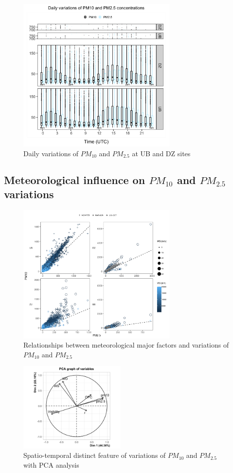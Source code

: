 \documentclass[
  11pt,
]{article}
\begin{document}
\newpage

\begin{figure}
\centering
\includegraphics[width=3.125in,height=\textheight,keepaspectratio]{images/figure_5.png}
\caption{Daily variations of \(PM_{10}\) and \(PM_{2.5}\) at UB and DZ
sites}
\end{figure}

\newpage
\subsection{Meteorological influence on $PM_{10}$ and $PM_{2.5}$ variations}
\label{subsec2}

\begin{figure}
\centering
\includegraphics[width=3.125in,height=\textheight,keepaspectratio]{images/figure_6.png}
\caption{Relationships between meteorological major factors and
variations of \(PM_{10}\) and \(PM_{2.5}\)}
\end{figure}

\newpage

\begin{figure}
\centering
\includegraphics[width=2.08333in,height=\textheight,keepaspectratio]{images/figure_7.png}
\caption{Spatio-temporal distinct feature of variations of \(PM_{10}\)
and \(PM_{2.5}\) with PCA analysis}
\end{figure}
\end{document}
